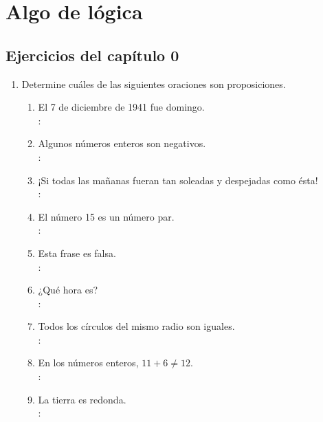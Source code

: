 \chapter{Algo de lógica}

\setcounter{section}{3}
\section{Ejercicios del capítulo 0}

\begin{enumerate}[label=0.1.\arabic*]
	\item Determine cuáles de las siguientes oraciones son proposiciones.
	\begin{enumerate}[label=(\arabic*)]
		\item El 7 de diciembre de 1941 fue domingo. \\
		\solucion: \\
		
		\item Algunos números enteros son negativos. \\
		\solucion: \\
		
		\item ¡Si todas las mañanas fueran tan soleadas y despejadas como ésta! \\
		\solucion: \\
		
		\item El número 15 es un número par. \\
		\solucion: \\
		
		\item Esta frase es falsa. \\
		\solucion: \\
		
		\item ¿Qué hora es? \\
		\solucion: \\
		
		\item Todos los círculos del mismo radio son iguales. \\
		\solucion: \\
		
		\item En los números enteros, $ 11+6 \neq 12 $. \\
		\solucion: \\
		
		\item La tierra es redonda. \\
		\solucion: \\
		

\end{enumerate}
\end{enumerate}
